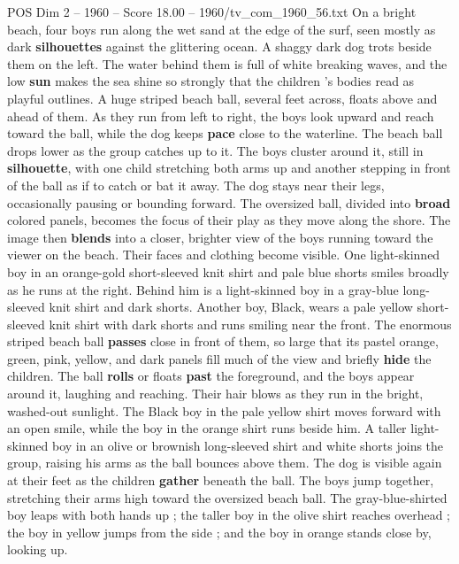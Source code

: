 \begin{textsample}{POS Dim 2 – 1960 – Score 18.00 – 1960/tv\_com\_1960\_56.txt}  \label{ex:f2_pos_009}
On a bright beach, four boys run along the wet sand at the edge of the surf, seen mostly as dark \textbf{silhouettes} against the glittering ocean.
A shaggy dark dog trots beside them on the left.
The water behind them is full of white breaking waves, and the low \textbf{sun} makes the sea shine so strongly that the children ’s bodies read as playful outlines.
A huge striped beach ball, several feet across, floats above and ahead of them.
As they run from left to right, the boys look upward and reach toward the ball, while the dog keeps \textbf{pace} close to the waterline.
The beach ball drops lower as the group catches up to it.
The boys cluster around it, still in \textbf{silhouette}, with one child stretching both arms up and another stepping in front of the ball as if to catch or bat it away.
The dog stays near their legs, occasionally pausing or bounding forward.
The oversized ball, divided into \textbf{broad} colored panels, becomes the focus of their play as they move along the shore.
The image then \textbf{blends} into a closer, brighter view of the boys running toward the viewer on the beach.
Their faces and clothing become visible.
One light-skinned boy in an orange-gold short-sleeved knit shirt and pale blue shorts smiles broadly as he runs at the right.
Behind him is a light-skinned boy in a gray-blue long-sleeved knit shirt and dark shorts.
Another boy, Black, wears a pale yellow short-sleeved knit shirt with dark shorts and runs smiling near the front.
The enormous striped beach ball \textbf{passes} close in front of them, so large that its pastel orange, green, pink, yellow, and dark panels fill much of the view and briefly \textbf{hide} the children.
The ball \textbf{rolls} or floats \textbf{past} the foreground, and the boys appear around it, laughing and reaching.
Their hair blows as they run in the bright, washed-out sunlight.
The Black boy in the pale yellow shirt moves forward with an open smile, while the boy in the orange shirt runs beside him.
A taller light-skinned boy in an olive or brownish long-sleeved shirt and white shorts joins the group, raising his arms as the ball bounces above them.
The dog is visible again at their feet as the children \textbf{gather} beneath the ball.
The boys jump together, stretching their arms high toward the oversized beach ball.
The gray-blue-shirted boy leaps with both hands up ; the taller boy in the olive shirt reaches overhead ; the boy in yellow jumps from the side ; and the boy in orange stands close by, looking up.

\end{textsample}
